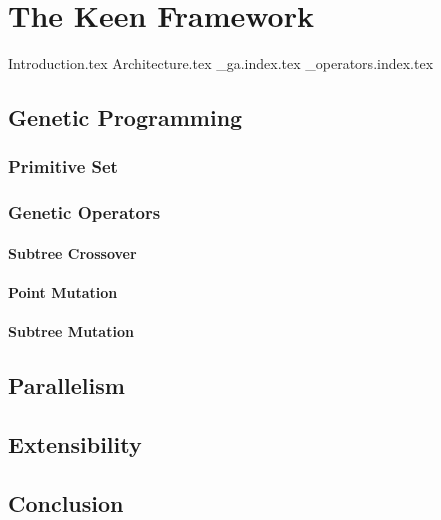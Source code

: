 \chapter{The Keen Framework}
\label{chap:keen}
  {Introduction.tex}
  {Architecture.tex}
  {_ga.index.tex}
  {_operators.index.tex}
  
  \section{Genetic Programming}
  \label{sec:genetic_programming}
    \subsection{Primitive Set}
    \label{sec:keen:gp:primitive_set}
      \Blindtext
    \subsection{Genetic Operators}
    \label{sec:keen:gp:op}
      \subsubsection{Subtree Crossover}
      \label{sec:keen:gp:op:cx:subtree}
        \Blindtext
      \subsubsection{Point Mutation}
      \label{sec:keen:gp:op:mutation:point}
        \Blindtext
      \subsubsection{Subtree Mutation}
      \label{sec:keen:op:mut:subtree}
        \Blindtext
  \section{Parallelism}
  \label{sec:parallelism}
    \Blindtext
  \section{Extensibility}
  \label{sec:extensibility}
    \Blindtext
  \section{Conclusion}
  \label{sec:conclusion}
    \Blindtext
